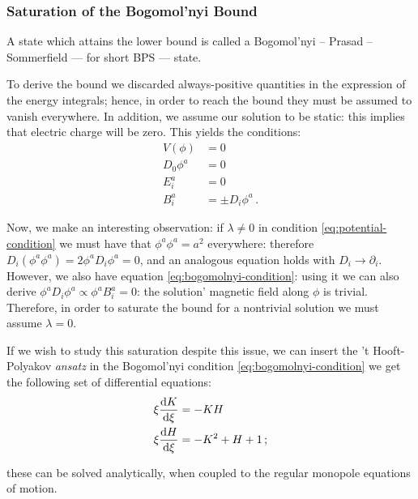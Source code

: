 \documentclass[main.tex]{subfiles}
\begin{document}
\subsubsection{Saturation of the Bogomol'nyi Bound}

A state which attains the lower bound is called a Bogomol'nyi – Prasad – Sommerfield --- for short BPS --- state.

To derive the bound we discarded always-positive quantities in the expression of the energy integrals; hence, in order to reach the bound they must be assumed to vanish everywhere. In addition, we assume our solution to be static: this implies that electric charge will be zero. This yields the conditions:
%
\begin{subequations}
\begin{align}
  V(\phi) &= 0 \label{eq:potential-condition}   \\
  D_0 \phi^a &= 0  \\
  E_i^a &= 0  \\
  B_i^a &= \pm D_i \phi^a  \label{eq:bogomolnyi-condition} \,.
\end{align}
\end{subequations}

Now, we make an interesting observation: if \(\lambda \neq 0\) in condition \eqref{eq:potential-condition} we must have that \(\phi^a \phi^a = a^2\) everywhere: therefore \(D_i (\phi^a \phi^a) = 2 \phi^a D_i \phi^a = 0\), and an analogous equation holds with \(D_i \rightarrow \partial_i\).
However, we also have equation \eqref{eq:bogomolnyi-condition}: using it we can also derive \(\phi^a D_i \phi^a \propto \phi^a B_i^a = 0\): the solution' magnetic field along \(\phi \) is trivial.
Therefore, in order to saturate the bound for a nontrivial solution we must assume \(\lambda = 0\).

If we wish to study this saturation despite this issue, we can insert the 't Hooft-Polyakov \emph{ansatz} in the Bogomol'nyi condition \eqref{eq:bogomolnyi-condition} we get the following set of differential equations:
%
\begin{subequations}
\begin{align}
  \xi \dv{K}{\xi}  &=  -KH   \\
  \xi \dv{H}{\xi} &= -K^2 + H + 1 \,;
\end{align}
\end{subequations}

these can be solved analytically, when coupled to the regular monopole equations of motion.
\end{document}
